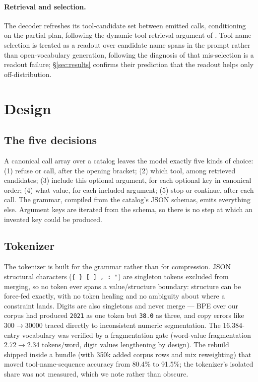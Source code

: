 \documentclass[10pt]{article}
\begin{document}
\paragraph{Retrieval and selection.} The decoder refreshes its tool-candidate
set between emitted calls, conditioning on the partial plan, following the
dynamic tool retrieval argument of \citet{dtdr}. Tool-name selection is
treated as a readout over candidate name spans in the prompt rather than
open-vocabulary generation, following the diagnosis of \citet{lnp} that
mis-selection is a readout failure; \S\ref{sec:results} confirms their
prediction that the readout helps only off-distribution.

\section{Design}
\label{sec:design}

\subsection{The five decisions}

A canonical call array over a catalog leaves the model exactly five kinds of
choice: (1) refuse or call, after the opening bracket; (2) which tool, among
retrieved candidates; (3) include this optional argument, for each optional
key in canonical order; (4) what value, for each included argument; (5) stop
or continue, after each call. The grammar, compiled from the catalog's JSON
schemas, emits everything else. Argument keys are iterated from the schema, so
there is no step at which an invented key could be produced.

\subsection{Tokenizer}

The tokenizer is built for the grammar rather than for compression. JSON
structural characters (\verb|{ } [ ] , : "|) are singleton tokens excluded
from merging, so no token ever spans a value/structure boundary: structure can
be force-fed exactly, with no token healing and no ambiguity about where a
constraint lands. Digits are also singletons and never merge --- BPE over our
corpus had produced \texttt{2021} as one token but \texttt{38.0} as three, and
copy errors like $300\to30000$ traced directly to inconsistent numeric
segmentation. The 16{,}384-entry vocabulary was verified by a fragmentation
gate (word-value fragmentation 2.72$\to$2.34 tokens/word, digit values
lengthening by design). The rebuild shipped inside a bundle (with 350k added
corpus rows and mix reweighting) that moved tool-name-sequence accuracy from
80.4\% to 91.5\%; the tokenizer's isolated share was not measured, which we
note rather than obscure.
\end{document}
